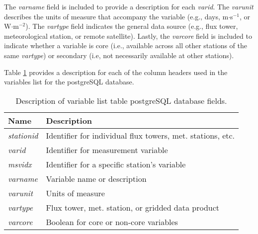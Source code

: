 The \emph{varname} field is included to provide a description for each \emph{varid}. 
The \emph{varunit} describes the units of measure that accompany the variable (e.g., days, m$\cdot$s$^{-1}$, or W$\cdot$m$^{-2}$).  
The \emph{vartype} field indicates the general data source (e.g., flux tower, meteorological station, or remote satellite). 
Lastly, the \emph{varcore} field is included to indicate whether a variable is core (i.e., available across all other stations of the same \emph{vartype}) or secondary (i.e, not necessarily available at other stations).

Table \ref{tab:varlist} provides a description for each of the column headers used in the variables list for the postgreSQL database.

\begin{table}
    \caption{Description of variable list table postgreSQL database fields.}
    \label{tab:varlist}
    \centering
    \begin{tabular}{l l}
        \hline
        \bf{Name} & \bf{Description}\\
        \hline
        \emph{stationid} & Identifier for individual flux towers, met. stations, etc.\\
        
        \emph{varid} & Identifier for measurement variable\\
        
        \emph{msvidx} & Identifier for a specific station's variable\\
        
        \emph{varname} & Variable name or description\\
        
        \emph{varunit} & Units of measure\\
        
        \emph{vartype} & Flux tower, met. station, or gridded data product\\
        
        \emph{varcore} & Boolean for core or non-core variables\\
        \hline
    \end{tabular}
\end{table}

